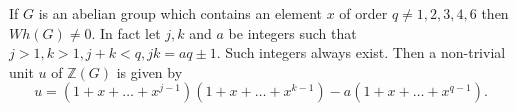 If $G$ is an abelian group which contains an element $x$ of order $q \neq 1, 2, 3, 4, 6$ then $Wh(G) \neq 0$. In fact let $j, k$ and $a$ be integers such that $j > 1, k > 1, j + k < q, jk = aq \pm 1$. Such integers always exist. Then a non-trivial unit $u$ of $\mathbb{Z}(G)$ is given by
$$u = (1 + x + \ldots + x^{j-1})(1 + x + \ldots + x^{k-1}) - a(1 + x + \ldots + x^{q-1}).$$
